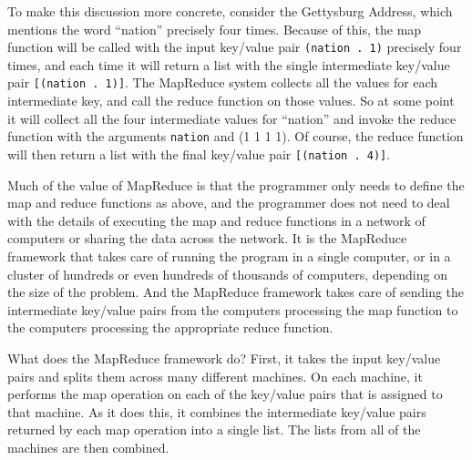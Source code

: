 To make this discussion more concrete, consider the Gettysburg Address,
which mentions the word ``nation'' precisely four times. Because of this,
the map function will be called with the input key/value pair \texttt{(nation~.~1)}
precisely four times, and each time it will return a list with
the single intermediate key/value pair \texttt{[(nation~.~1)]}. The MapReduce
system collects all the values for each intermediate key, and call the reduce
function on those values. So at some point it will collect all the four intermediate
values for ``nation'' and invoke the reduce function with the arguments
\texttt{nation} and {(1 1 1 1)}. Of course, the reduce function will then
return a list with the final key/value pair \texttt{[(nation~.~4)]}.


Much of the value of MapReduce is that the programmer only needs to
define the map and reduce functions as above, and the programmer
does not need to deal with the details of executing the map and reduce
functions in a network of computers or sharing the data across the
network.  It is the MapReduce
framework that takes care of running the program in a single
computer, or in a cluster of hundreds or even hundreds of thousands 
of computers, depending on the size of the problem. And the MapReduce
framework takes care of sending the intermediate key/value pairs
from the computers processing the map function to the computers
processing the appropriate reduce function.

What does the MapReduce framework do?  First, it
takes the input key/value pairs and splits them across many
different machines.  On each machine, it performs the map
operation on each of the key/value pairs that is assigned to
that machine.  As it does this, it combines the intermediate
key/value pairs returned by each map operation into a single
list.  The lists from all of the machines are then combined.


